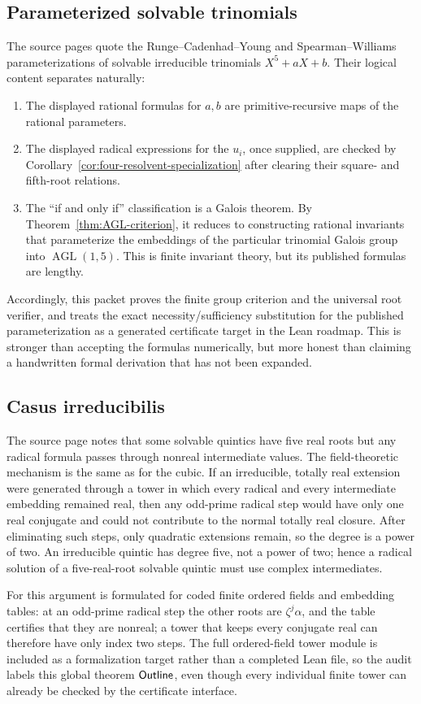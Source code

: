 \subsection{Parameterized solvable trinomials}

The source pages quote the Runge--Cadenhad--Young and Spearman--Williams
parameterizations of solvable irreducible trinomials \(X^5+aX+b\).  Their
logical content separates naturally:

\begin{enumerate}
\item The displayed rational formulas for \(a,b\) are primitive-recursive
      maps of the rational parameters.
\item The displayed radical expressions for the \(u_i\), once supplied, are
      checked by Corollary~\ref{cor:four-resolvent-specialization} after
      clearing their square- and fifth-root relations.
\item The ``if and only if'' classification is a Galois theorem.  By
      Theorem~\ref{thm:AGL-criterion}, it reduces to constructing rational
      invariants that parameterize the embeddings of the particular trinomial
      Galois group into \(\operatorname{AGL}(1,5)\).  This is finite invariant
      theory, but its published formulas are lengthy.
\end{enumerate}

Accordingly, this packet proves the finite group criterion and the universal
root verifier, and treats the exact necessity/sufficiency substitution for the
published parameterization as a generated certificate target in the Lean
roadmap.  This is stronger than accepting the formulas numerically, but more
honest than claiming a handwritten formal derivation that has not been
expanded.

\subsection{Casus irreducibilis}

The source page notes that some solvable quintics have five real roots but any
radical formula passes through nonreal intermediate values.  The field-theoretic
mechanism is the same as for the cubic.  If an irreducible, totally real
extension were generated through a tower in which every radical and every
intermediate embedding remained real, then any odd-prime radical step would
have only one real conjugate and could not contribute to the normal totally
real closure.  After eliminating such steps, only quadratic extensions remain,
so the degree is a power of two.  An irreducible quintic has degree five, not a
power of two; hence a radical solution of a five-real-root solvable quintic must
use complex intermediates.

For \ipra{} this argument is formulated for coded finite ordered fields and
embedding tables: at an odd-prime radical step the other roots are
\(\zeta^j\alpha\), and the table certifies that they are nonreal; a tower that
keeps every conjugate real can therefore have only index two steps.  The full
ordered-field tower module is included as a formalization target rather than a
completed Lean file, so the audit labels this global theorem \(\textsf{Outline}\), even
though every individual finite tower can already be checked by the certificate
interface.
